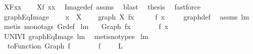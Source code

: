 \begin{isabellebody}
\ {\isacharquery}X{\isacharequal}{\isachardoublequoteopen}{\isacharquery}F{\isacharbackquote}{\isacharbackquote}{\isacharbraceleft}xx{\isacharbraceright}{\isachardoublequoteclose}\isanewline
\ \ \isamarkupfalse%
\ {\isachardoublequoteopen}{\isacharquery}X{\isacharequal}{\isacharbraceleft}f\ xx{\isacharbraceright}{\isachardoublequoteclose}\ \isamarkupfalse%
\ Image{\isacharunderscore}def\ assms\ \isamarkupfalse%
\ blast\ \isamarkupfalse%
\ {\isacharquery}thesis\ \isamarkupfalse%
\ fastforce\ \isanewline
{}\isamarkupfalse%
%
\endisatagproof
{\isafoldproof}%
%
\isadelimproof
\isanewline
%
\endisadelimproof
\isanewline
{}\isamarkupfalse%
\ graphEqImage{\isacharcolon}\ \isanewline
\ \ \ {\isachardoublequoteopen}x\ {\isasymin}\ X{\isachardoublequoteclose}\ \isanewline
\ \ \ {\isachardoublequoteopen}graph\ X\ f{\isacharcomma}{\isacharcomma}x\ \ \ {\isacharequal}\ \ \ f\ x{\isachardoublequoteclose}\ \isanewline
%
\isadelimproof
\ \ %
\endisadelimproof
%
\isatagproof
{}\isamarkupfalse%
\ graph{\isacharunderscore}def\ \isamarkupfalse%
\ assms\ lm{}{}{}\ \isamarkupfalse%
\ {\isacharparenleft}metis\ {\isacharparenleft}mono{\isacharunderscore}tags{\isacharparenright}\ Gr{\isacharunderscore}def{\isacharparenright}%
\endisatagproof
{\isafoldproof}%
%
\isadelimproof
\isanewline
%
\endisadelimproof
\isanewline
{}\isamarkupfalse%
\ lm{}{}{}{\isacharcolon}\ \isanewline
\ \ {\isachardoublequoteopen}Graph\ f{\isacharcomma}{\isacharcomma}x\ \ \ \ {\isacharequal}\ \ \ \ f\ x{\isachardoublequoteclose}\ \isanewline
%
\isadelimproof
\ \ %
\endisadelimproof
%
\isatagproof
{}\isamarkupfalse%
\ UNIV{\isacharunderscore}I\ graphEqImage\ lm{}{}{}\ \isamarkupfalse%
\ {\isacharparenleft}metis{\isacharparenleft}no{\isacharunderscore}types{\isacharparenright}{\isacharparenright}%
\endisatagproof
{\isafoldproof}%
%
\isadelimproof
\isanewline
%
\endisadelimproof
\isanewline
{}\isamarkupfalse%
\ lm{}{}{}{\isacharcolon}\ \isanewline
\ \ {\isachardoublequoteopen}toFunction\ {\isacharparenleft}Graph\ f{\isacharparenright}\ \ \ \ {\isacharequal}\ \ \ \ f{\isachardoublequoteclose}\ \ \ \ {\isacharparenleft}\ {\isachardoublequoteopen}{\isacharquery}L{\isacharequal}{\isacharunderscore}{\isachardoublequoteclose}{\isacharparenright}\ \isanewline

\end{isabellebody}
